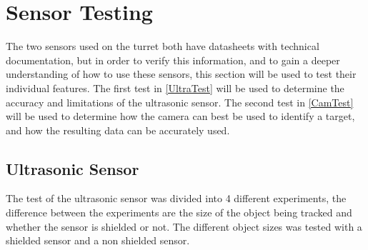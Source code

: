 \section{Sensor Testing}
The two sensors used on the turret both have datasheets with technical
documentation, but in order to verify this information, and to gain a
deeper understanding of how to use these sensors, this section will be used to
test their individual features. The first test in \autoref{UltraTest} will be
used to determine the accuracy and limitations of the ultrasonic sensor. The second
test in \autoref{CamTest} will be used to determine how the camera can best be
used to identify a target, and how the resulting data can be accurately used. 

% 
 


\subsection{Ultrasonic Sensor}\label{UltraTest}
The test of the ultrasonic sensor was divided into 4 different experiments, the
difference between the experiments are the size of the object being tracked and
whether the sensor is shielded or not. The different object sizes was tested
with a shielded sensor and a non shielded sensor. \nl

